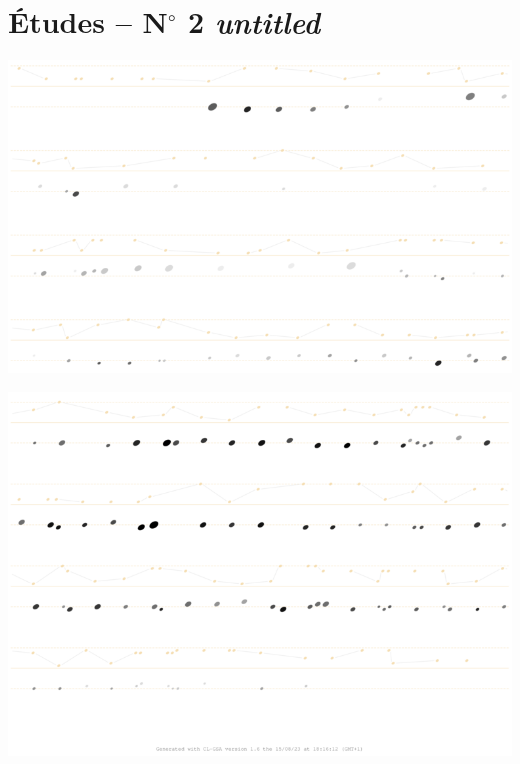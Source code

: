 \newpage

{}
\thispagestyle{empty}

\section*{\'{E}tudes -- N$^{\circ}$ 2 \textsl{untitled}}
\label{esg}

\vspace{10mm}

\begin{center}
\includegraphics[width=\textwidth]{mp/img/s2-0}
\end{center}

\vspace{-2mm}

\begin{center}
\includegraphics[width=\textwidth]{mp/img/s2-1}
\end{center}
